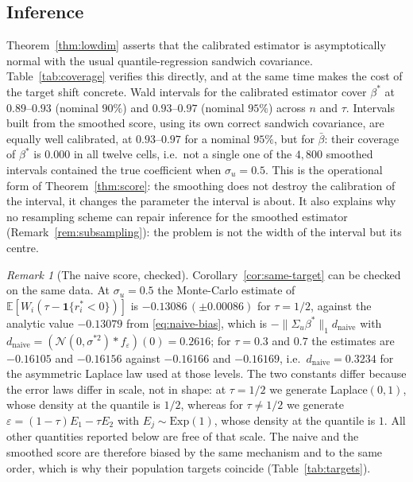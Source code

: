\documentclass[12pt,a4paper]{article}
\theoremstyle{definition}
\theoremstyle{remark}
\newtheorem{remark}[theorem]{Remark}
\newcommand{\E}{\mathbb{E}}
\newcommand{\cN}{\mathcal{N}}
\newcommand{\ind}[1]{\mathbf{1}\{#1\}}
\newcommand{\norm}[1]{\|#1\|}
\newcommand{\betas}{\beta^*}
\newcommand{\bbar}{\bar{\beta}}
\begin{document}
\subsection{Inference}
\label{sec:coverage}

Theorem~\ref{thm:lowdim} asserts that the calibrated estimator is asymptotically normal
with the usual quantile-regression sandwich covariance. Table~\ref{tab:coverage} verifies
this directly, and at the same time makes the cost of the target shift concrete. Wald
intervals for the calibrated estimator cover $\betas$ at $0.89$--$0.93$ (nominal $90\%$)
and $0.93$--$0.97$ (nominal $95\%$) across $n$ and $\tau$. Intervals built from the
smoothed score, using its own correct sandwich covariance, are equally well calibrated, at
$0.93$--$0.97$ for a nominal $95\%$, but for $\bbar$: their coverage of $\betas$
is $0.000$ in all twelve cells, i.e.\ not a single one of the $4{,}800$ smoothed intervals
contained the true coefficient when $\sigma_u=0.5$. This is the operational form of
Theorem~\ref{thm:score}: the smoothing does not destroy the calibration of the interval, it
changes the parameter the interval is about. It also explains why no resampling scheme can
repair inference for the smoothed estimator (Remark~\ref{rem:subsampling}): the problem is not the width of the interval but its centre.



\begin{remark}[The naive score, checked]
Corollary~\ref{cor:same-target} can be checked on the same data. At $\sigma_u=0.5$ the
Monte-Carlo estimate of $\E[W_i(\tau-\ind{r_i^*<0})]$ is $-0.13086\,(\pm0.00086)$ for
$\tau=1/2$, against the analytic value $-0.13079$ from \eqref{eq:naive-bias}, which is
$-\norm{\Sigma_u\betas}_1d_{\mathrm{naive}}$ with
$d_{\mathrm{naive}}=(\cN(0,\sigma^{*2})*f_\varepsilon)(0)=0.2616$; for
$\tau=0.3$ and $0.7$ the estimates are $-0.16105$ and $-0.16156$ against $-0.16166$ and
$-0.16169$, i.e.\ $d_{\mathrm{naive}}=0.3234$ for the asymmetric Laplace law used at those
levels. The two constants differ because the error laws differ in scale, not in shape: at
$\tau=1/2$ we generate Laplace$(0,1)$, whose density at the quantile is $1/2$, whereas for
$\tau\neq1/2$ we generate $\varepsilon=(1-\tau)E_1-\tau E_2$ with $E_j\sim\mathrm{Exp}(1)$,
whose density at the quantile is $1$. All other quantities reported below are free of that
scale. The naive and the smoothed score are therefore biased by the same mechanism
and to the same order, which is why their population targets coincide
(Table~\ref{tab:targets}).
\end{remark}
\end{document}
